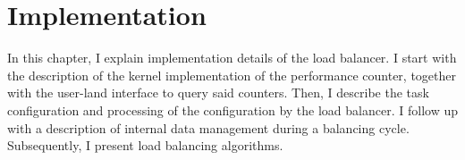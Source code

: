 \chapter{Implementation}
\label{sec:implementation}


In this chapter, I explain implementation details of the load balancer.
I start with the description of the kernel implementation of the performance
counter, together with the user-land interface to query said counters.
Then, I describe the task configuration and processing of the configuration by
the load balancer.
I follow up with a description of internal data management during a balancing cycle.
Subsequently, I present load balancing algorithms.







\cleardoublepage


